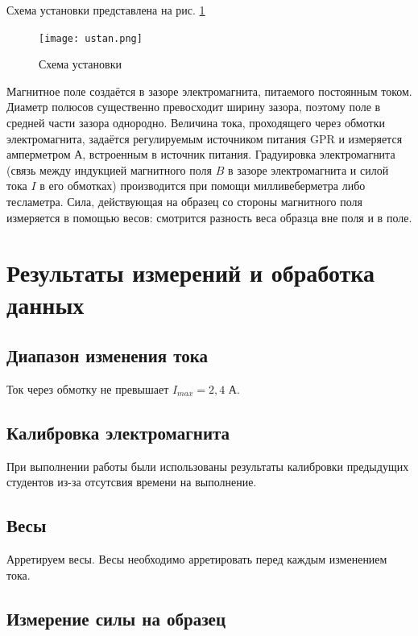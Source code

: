 \documentclass[a4paper,12pt]{article}
\begin{document}
Схема установки представлена на рис. \ref{pic:2}

\clearpage

\begin{figure}[!h]
    \center
    \texttt{[image: ustan.png]}
    \caption{Схема установки}
    \label{pic:2}
\end{figure}

Магнитное поле создаётся в зазоре электромагнита, питаемого постоянным током. Диаметр полюсов существенно превосходит ширину зазора, поэтому поле в средней части зазора однородно. Величина тока, проходящего через обмотки электромагнита, задаётся регулируемым источником питания GPR и измеряется амперметром $А$, встроенным в источник питания. Градуировка электромагнита (связь между индукцией магнитного поля $B$ в зазоре электромагнита и силой тока $I$ в его обмотках) производится при помощи милливеберметра либо тесламетра.
Сила, действующая на образец со стороны магнитного поля измеряется в помощью весов: смотрится разность веса образца вне поля и в поле.

\section{Результаты измерений и обработка данных}

\subsection{Диапазон изменения тока}

Ток через обмотку не превышает $I_{max} = 2,4$ А.

\subsection{Калибровка электромагнита}

При выполнении работы были использованы результаты калибровки предыдущих студентов из-за отсутсвия времени на выполнение.

\subsection{Весы}

Арретируем весы. Весы необходимо арретировать перед каждым изменением тока.

\subsection{Измерение силы на образец}
\end{document}
